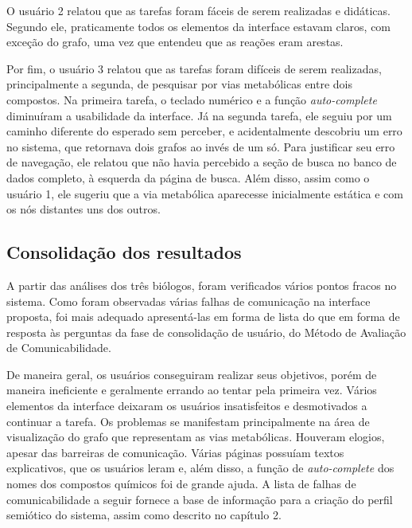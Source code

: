 \indent O usuário 2 relatou que as tarefas foram fáceis de serem realizadas e didáticas. Segundo ele, praticamente todos os elementos da interface estavam claros, com exceção do grafo, uma vez que entendeu que as reações eram arestas.

\indent Por fim, o usuário 3 relatou que as tarefas foram difíceis de serem realizadas, principalmente a segunda, de pesquisar por vias metabólicas entre dois compostos. Na primeira tarefa, o teclado numérico e a função \textit{auto-complete} diminuíram a usabilidade da interface. Já na segunda tarefa, ele seguiu por um caminho diferente do esperado sem perceber, e acidentalmente descobriu um erro no sistema, que retornava dois grafos ao invés de um só. Para justificar seu erro de navegação, ele relatou que não havia percebido a seção de busca no banco de dados completo, à esquerda da página de busca. Além disso, assim como o usuário 1, ele sugeriu que a via metabólica aparecesse inicialmente estática e com os nós distantes uns dos outros.

\subsection{Consolidação dos resultados}

\indent A partir das análises dos três biólogos, foram verificados vários pontos fracos no sistema. Como foram observadas várias falhas de comunicação na interface proposta, foi mais adequado apresentá-las em forma de lista do que em forma de resposta às perguntas da fase de consolidação de usuário, do Método de Avaliação de Comunicabilidade.

\indent De maneira geral, os usuários conseguiram realizar seus objetivos, porém de maneira ineficiente e geralmente errando ao tentar pela primeira vez. Vários elementos da interface deixaram os usuários insatisfeitos e desmotivados a continuar a tarefa. Os problemas se manifestam principalmente na área de visualização do grafo que representam as vias metabólicas. Houveram elogios, apesar das barreiras de comunicação. Várias páginas possuíam textos explicativos, que os usuários leram e, além disso, a função de \textit{auto-complete} dos nomes dos compostos químicos foi de grande ajuda. A lista de falhas de comunicabilidade a seguir fornece a base de informação para a criação do perfil semiótico do sistema, assim como descrito no capítulo 2.

